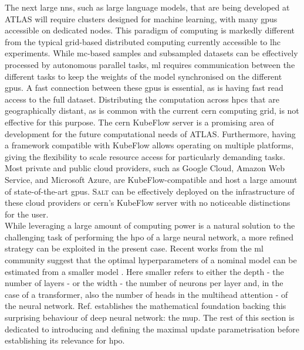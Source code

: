 The next large \glspl{nn}, such as large language models, that are being developed at ATLAS will require clusters designed for machine learning, with many \glspl{gpu} accessible on dedicated nodes. This paradigm of computing is markedly different from the typical grid-based distributed computing currently accessible to \gls{lhc} experiments. While \gls{mc}-based samples and subsampled datasets can be effectively processed by autonomous parallel tasks, \gls{ml} requires communication between the different tasks to keep the weights of the model synchronised on the different \glspl{gpu}. A fast connection between these \glspl{gpu} is essential, as is having fast read access to the full dataset. Distributing the computation across \glspl{hpc} that are geographically distant, as is common with the current \gls{cern} computing grid, is not effective for this purpose. The \gls{cern} KubeFlow server is a promising area of development for the future computational needs of ATLAS. Furthermore, having a framework compatible with KubeFlow allows operating on multiple platforms, giving the flexibility to scale resource access for particularly demanding tasks. Most private and public cloud providers, such as Google Cloud, Amazon Web Service, and Microsoft Azure, are KubeFlow-compatible and host a large amount of state-of-the-art \glspl{gpu}. \textsc{Salt} can be effectively deployed on the infrastructure of these cloud providers or \gls{cern}'s KubeFlow server with no noticeable distinctions for the user. \\

While leveraging a large amount of computing power is a natural solution to the challenging task of performing the \gls{hpo} of a large neural network, a more refined strategy can be exploited in the present case. Recent works from the \gls{ml} community suggest that the optimal hyperparameters of a nominal model can be estimated from a smaller model \cite{yang2021tuning}. Here smaller refers to either the depth - the number of layers - or the width - the number of neurons per layer and, in the case of a transformer, also the number of heads in the multihead attention - of the neural network. Ref. \cite{pmlr-v139-yang21c} establishes the mathematical foundation backing this surprising behaviour of deep neural network: the \gls{mup}. The rest of this section is dedicated to introducing and defining the maximal update parametrisation before establishing its relevance for \gls{hpo}.

